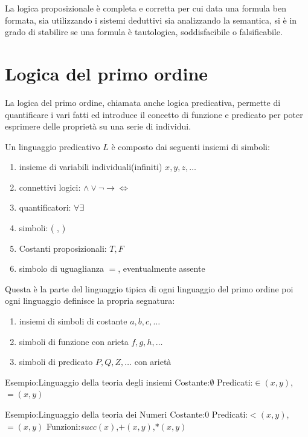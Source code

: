 \documentclass[a4paper]{book}
\begin{document}
La logica proposizionale è completa e corretta per cui data una formula ben formata, sia utilizzando i sistemi deduttivi sia analizzando
la semantica, si è in grado di stabilire se una formula è tautologica, soddisfacibile o falsificabile.

\section{Logica del primo ordine}
La logica del primo ordine, chiamata anche logica predicativa, permette di quantificare i vari fatti ed introduce il concetto di funzione e
predicato per poter esprimere delle proprietà su una serie di individui.

Un linguaggio predicativo $L$ è composto dai seguenti insiemi di simboli:
\begin{enumerate}
    \item insieme di variabili individuali(infiniti) $x,y,z,\dots$
    \item connettivi logici: $\land \lor \neg \rightarrow \iff$
    \item quantificatori: $\forall \exists$
    \item simboli: ( , )
    \item Costanti proposizionali: $T,F$
    \item simbolo di uguaglianza $=$, eventualmente assente
\end{enumerate}
Questa è la parte del linguaggio tipica di ogni linguaggio del primo ordine poi ogni linguaggio definisce la propria segnatura:
\begin{enumerate}
    \item insiemi di simboli di costante $a,b,c,\dots$
    \item simboli di funzione con arieta $f,g,h,\dots$
    \item simboli di predicato $P,Q,Z,\dots$ con arietà
\end{enumerate}

Esempio:Linguaggio della teoria degli insiemi \newline
Costante:$\emptyset$\newline
Predicati:$\in(x,y)$, $=(x,y)$

Esempio:Linguaggio della teoria dei Numeri \newline
Costante:$0$ \newline
Predicati:$<(x,y)$,$=(x,y)$ \newline
Funzioni:$succ(x)$,$+(x,y)$,$*(x,y)$
\end{document}
